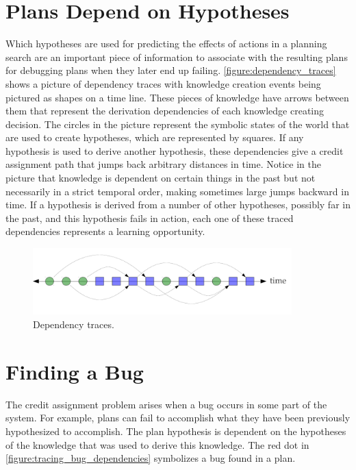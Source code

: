 \section{Plans Depend on Hypotheses}

Which hypotheses are used for predicting the effects of actions in a
planning search are an important piece of information to associate
with the resulting plans for debugging plans when they later end up
failing.  \autoref{figure:dependency_traces} shows a picture of
dependency traces with knowledge creation events being pictured as
shapes on a time line.  These pieces of knowledge have arrows between
them that represent the derivation dependencies of each knowledge
creating decision.  The circles in the picture represent the symbolic
states of the world that are used to create hypotheses, which are
represented by squares.  If any hypothesis is used to derive another
hypothesis, these dependencies give a credit assignment path that
jumps back arbitrary distances in time.  Notice in the picture that
knowledge is dependent on certain things in the past but not
necessarily in a strict temporal order, making sometimes large jumps
backward in time.  If a hypothesis is derived from a number of other
hypotheses, possibly far in the past, and this hypothesis fails in
action, each one of these traced dependencies represents a learning
opportunity.
\begin{figure}
\center
\includegraphics[width=10cm]{gfx/dependency_traces}
\caption{Dependency traces.}
\label{figure:dependency_traces}
\end{figure}

\section{Finding a Bug}

The credit assignment problem arises when a bug occurs in some part of
the system.  For example, plans can fail to accomplish what they have
been previously hypothesized to accomplish.  The plan hypothesis is
dependent on the hypotheses of the knowledge that was used to derive
this knowledge.  The red dot in
\autoref{figure:tracing_bug_dependencies} symbolizes a bug found in a
plan.

